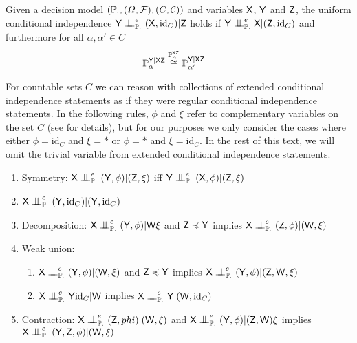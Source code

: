 \begin{definition}\label{def:eci}
Given a decision model $(\mathbb{P}_\cdot, (\Omega,\mathcal{F}), (C,\mathcal{C}))$ and variables $\mathsf{X}$, $\mathsf{Y}$ and $\mathsf{Z}$, the uniform conditional independence $\RV{Y}\CI^e_{\prob{P}_\cdot} (\RV{X}, \mathrm{id}_C)|\RV{Z}$ holds if $\RV{Y}\CI^e_{\prob{P}_\cdot} \RV{X} |(\RV{Z}, \mathrm{id}_C)$ and furthermore for all $\alpha,\alpha'\in C$
\begin{align}
    \mathbb{P}_\alpha^{\mathsf{Y}|\mathsf{XZ}} &\overset{\mathbb{P}_\alpha^{\mathsf{XZ}}}{\cong} \mathbb{P}_{\alpha'}^{\mathsf{Y}|\mathsf{XZ}}\label{eq:uci}
\end{align}
\end{definition}

For countable sets $C$ we can reason with collections of extended conditional independence statements as if they were regular conditional independence statements. In the following rules, $\phi$ and $\xi$ refer to complementary variables on the set $C$ (see \citet{constantinou_extended_2017} for details), but for our purposes we only consider the cases where either $\phi=\mathrm{id}_C$ and $\xi=*$ or $\phi=*$ and $\xi=\mathrm{id}_C$. In the rest of this text, we will omit the trivial variable from extended conditional independence statements.

\begin{enumerate}
    \item Symmetry: $\RV{X}\CI_{\prob{P}_{\cdot}}^e (\RV{Y}, \phi)|(\RV{Z}, \xi)$ iff $\RV{Y}\CI_{\prob{P}_{\cdot}}^e (\RV{X}, \phi)|(\RV{Z},\xi)$
    \item $\RV{X}\CI_{\prob{P}_{\cdot}}^e (\RV{Y}, \mathrm{id}_C)| (\RV{Y}, \mathrm{id}_C)$
    \item Decomposition: $\RV{X}\CI_{\prob{P}_{\cdot}}^e (\RV{Y}, \phi)|\RV{W}\xi$ and $\mathsf{Z}\preccurlyeq\mathsf{Y}$ implies $\RV{X}\CI_{\prob{P}_{\cdot}}^e(\RV{Z},\phi)|(\RV{W},\xi)$
    \item Weak union:
    \begin{enumerate}
     	\item $\RV{X}\CI^e_{\prob{P}_{\cdot}} (\RV{Y}, \phi)|(\RV{W}, \xi)$ and $\mathsf{Z}\preccurlyeq \mathsf{Y}$ implies $\RV{X}\CI_{\prob{P}_{\cdot}}^e(\RV{Y},\phi)|(\RV{Z},\RV{W}, \xi)$
     	\item $\RV{X}\CI_{\prob{P}_{\cdot}}^e \RV{Y} \mathrm{id}_{C}|\RV{W}$ implies $\RV{X}\CI_{\prob{P}_{\cdot}}^e\RV{Y}|(\RV{W},\mathrm{id}_C)$
     \end{enumerate} 
    \item Contraction: $\RV{X}\CI_{\prob{P}_{\cdot}}^e(\RV{Z},phi)|(\RV{W},\xi)$ and $\RV{X}\CI_{\prob{P}_{\cdot}}^e(\RV{Y},\phi)|(\RV{Z},\RV{W})\xi$ implies $\RV{X}\CI_{\prob{P}_{\cdot}}^e(\RV{Y},\RV{Z},\phi)|(\RV{W},\xi)$
\end{enumerate} 

